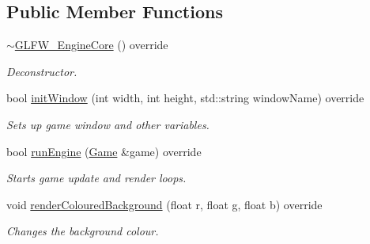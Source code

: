 \subsection*{Public Member Functions}
\begin{DoxyCompactItemize}
\item 
\mbox{\label{class_g_l_f_w___engine_core_adf17916892982f1103140b22dc1b37be}} 
\mbox{\hyperlink{class_g_l_f_w___engine_core_adf17916892982f1103140b22dc1b37be}{$\sim$\+G\+L\+F\+W\+\_\+\+Engine\+Core}} () override
\begin{DoxyCompactList}\small\item\em Deconstructor. \end{DoxyCompactList}\item 
\mbox{\label{class_g_l_f_w___engine_core_aa786131ec64e7ee6779c3ac1ee8507ce}} 
bool \mbox{\hyperlink{class_g_l_f_w___engine_core_aa786131ec64e7ee6779c3ac1ee8507ce}{init\+Window}} (int width, int height, std\+::string window\+Name) override
\begin{DoxyCompactList}\small\item\em Sets up game window and other variables. \end{DoxyCompactList}\item 
\mbox{\label{class_g_l_f_w___engine_core_adf9266f1a9b5d97992691224f0f20c7b}} 
bool \mbox{\hyperlink{class_g_l_f_w___engine_core_adf9266f1a9b5d97992691224f0f20c7b}{run\+Engine}} (\mbox{\hyperlink{class_game}{Game}} \&game) override
\begin{DoxyCompactList}\small\item\em Starts game update and render loops. \end{DoxyCompactList}\item 
\mbox{\label{class_g_l_f_w___engine_core_a6031a54b0978d6e0fd1be3f292c2059f}} 
void \mbox{\hyperlink{class_g_l_f_w___engine_core_a6031a54b0978d6e0fd1be3f292c2059f}{render\+Coloured\+Background}} (float r, float g, float b) override
\begin{DoxyCompactList}\small\item\em Changes the background colour. \end{DoxyCompactList}\item 
\mbox{\label{class_g_l_f_w___engine_core_a2aba4fb8a635f96fc4057ba841670a29}} 

\end{DoxyCompactItemize}
